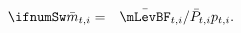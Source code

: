 \begin{eqnarray*}
  \label{eq:mBar}
\ifnumSw  \bar{m}_{t,i} & = & \bar{\mLevBF}_{t,i}/\bar{{P}}_{t,i}{p}_{t,i} .
\end{eqnarray*}
